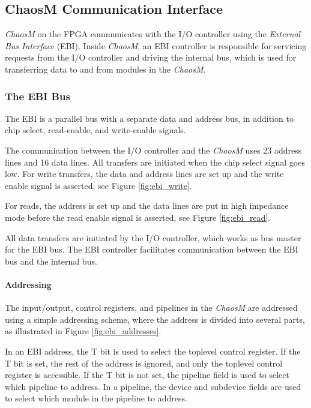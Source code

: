 
\FloatBarrier
\subsection{ChaosM Communication Interface}\label{section:fpga-buses}

\textit{ChaosM} on the FPGA communicates with the I/O controller using the \textit{External Bus Interface}
(EBI). Inside \textit{ChaosM}, an EBI controller is responsible
for servicing requests from the I/O controller and driving the internal bus, which
is used for transferring data to and from modules in the \textit{ChaosM}.

\subsubsection{The EBI Bus}
The EBI\cite{efm_ebi} is a parallel bus with a separate data and address bus, in
addition to chip select, read-enable, and write-enable signals.

The communication between the I/O controller and the \textit{ChaosM} uses 23 address lines and 16 data
lines. All transfers are initiated when the chip select signal goes low. For
write transfers, the data and address lines are set up and the write enable
signal is asserted, see Figure \ref{fig:ebi_write}.

For reads, the address is set up and the data lines are put in high impedance mode
before the read enable signal is asserted, see Figure \ref{fig:ebi_read}.




All data transfers are initiated by the I/O controller, which works as bus
master for the EBI bus. The EBI controller facilitates communication between
the EBI bus and the internal bus.

\FloatBarrier
\paragraph{Addressing}

The input/output, control registers, and pipelines in the \textit{ChaosM} are addressed
using a simple addressing scheme, where the address is divided into several
parts, as illustrated in Figure \ref{fig:ebi_addresses}.



In an EBI address, the T bit is used to select the toplevel control register.
If the T bit is set, the rest of the address is ignored, and only the toplevel
control register is accessible. If the T bit is not set, the pipeline field is
used to select which pipeline to address. In a pipeline, the device
and subdevice fields are used to select which module in the pipeline to address.

